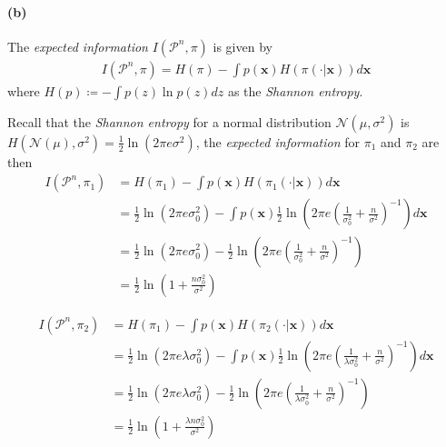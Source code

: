 \paragraph{(b)}
The \emph{expected information} $I(\mathcal{P}^n, \pi)$ is given by
\begin{align*}
    I(\mathcal{P}^n, \pi) = H(\pi) - \int p(\bm{x})H(\pi(\cdot \vert \bm{x}))d\bm{x}
\end{align*}
where $H(p) \coloneqq -\int p(z)\ln p(z)dz$ as the \emph{Shannon entropy}.

Recall that the \emph{Shannon entropy} for a normal distribution $\mathcal{N}(\mu, \sigma^2)$ is $H(\mathcal{N}(\mu), \sigma^2) = \frac{1}{2}\ln (2\pi e \sigma^2)$, the \emph{expected information} for $\pi_1$ and $\pi_2$ are then
\begin{align*}
    I(\mathcal{P}^n, \pi_1) 
    &= H(\pi_1) - \int p(\bm{x})H(\pi_1(\cdot \vert \bm{x}))d\bm{x}\\
    &= \frac{1}{2}\ln (2\pi e \sigma_0^2) - 
        \int p(\bm{x}) \frac{1}{2}\ln \left( 2\pi e \left( \frac{1}{\sigma_0^2} + \frac{n}{\sigma^2} \right)^{-1} \right) d\bm{x}\\
    &= \frac{1}{2}\ln (2\pi e \sigma_0^2) - \frac{1}{2}\ln \left( 2\pi e \left( \frac{1}{\sigma_0^2} + \frac{n}{\sigma^2} \right)^{-1} \right) \\
    &= \frac{1}{2}\ln \left(1 + \frac{n\sigma_0^2}{\sigma^2} \right)
\end{align*}

\begin{align*}
    I(\mathcal{P}^n, \pi_2)
    &= H(\pi_1) - \int p(\bm{x})H(\pi_2(\cdot \vert \bm{x}))d\bm{x}\\
    &= \frac{1}{2}\ln (2\pi e \lambda \sigma_0^2) - 
        \int p(\bm{x}) \frac{1}{2}\ln \left( 2\pi e \left( \frac{1}{\lambda \sigma_0^2} + \frac{n}{\sigma^2} \right)^{-1} \right) d\bm{x}\\
    &= \frac{1}{2}\ln (2\pi e \lambda \sigma_0^2) - 
        \frac{1}{2}\ln \left( 2\pi e \left( \frac{1}{\lambda \sigma_0^2} + \frac{n}{\sigma^2} \right)^{-1} \right)\\
    &= \frac{1}{2}\ln \left(1 + \frac{\lambda n\sigma_0^2}{\sigma^2} \right)
\end{align*}

